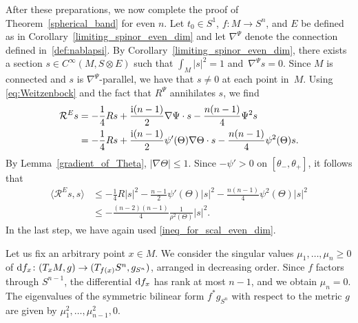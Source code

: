 After these preparations, we now complete the proof of Theorem~\ref{spherical_band} for even $n$.
Let $t_0 \in S^1$, $f\colon M \to S^n$, and $E$ be defined as in Corollary~\ref{limiting_spinor_even_dim} and let $\nabla^\Psi$ denote the connection defined in~\eqref{def:nablapsi}.
By Corollary~\ref{limiting_spinor_even_dim}, there exists a section $s \in C^\infty(M,S \otimes E)$ such that $\int_M |s|^2 = 1$ and~${\nabla^\Psi s = 0}$.
Since $M$ is connected and $s$ is $\nabla^\Psi$-parallel, we have that $s \neq 0$ at each point in~$M$. Using \eqref{eq:Weitzenbock} and the fact that $R^\Psi$ annihilates $s$, we find
\begin{align*}
\mathcal{R}^E s
&=
-\frac{1}{4} R s + \frac{{\rm i}(n-1)}{2} \nabla \Psi \cdot s - \frac{n(n-1)}{4} \Psi^2 s \\
&=
-\frac{1}{4} R s + \frac{{\rm i}(n-1)}{2} \psi'(\Theta) \nabla\Theta \cdot s - \frac{n(n-1)}{4} \psi^2(\Theta) s .
\end{align*}
By Lemma~\ref{gradient_of_Theta}, $|\nabla \Theta| \leq 1$. Since $-\psi' > 0$ on $[\theta_-,\theta_+]$, it follows that{\samepage
\begin{align}
\big\langle \mathcal{R}^E s,s \big\rangle
&\leq
-\frac{1}{4} R |s|^2 - \frac{n-1}{2} \psi'(\Theta) |s|^2 - \frac{n(n-1)}{4} \psi^2(\Theta) |s|^2\nonumber \\
&\leq
-\frac{(n-2)(n-1)}{4} \frac{1}{\rho^2(\Theta)} |s|^2. \label{estimate_curvature_E}
\end{align}
In the last step, we have again used \eqref{ineq_for_scal_even_dim}.}

Let us fix an arbitrary point $x \in M$. We consider the singular values $\mu_1, \ldots, \mu_n \geq 0$ of ${\rm d}f_x\colon (T_x M,g) \to (T_{f(x)} S^n,g_{S^n})$, arranged in decreasing order. Since $f$ factors through $S^{n-1}$, the differential ${\rm d}f_x$ has rank at most $n-1$, and we obtain $\mu_n = 0$. The eigenvalues of the symmetric bilinear form $f^* g_{S^n}$ with respect to the metric $g$ are given by $\mu_1^2,\hdots,\mu_{n-1}^2,0$.


